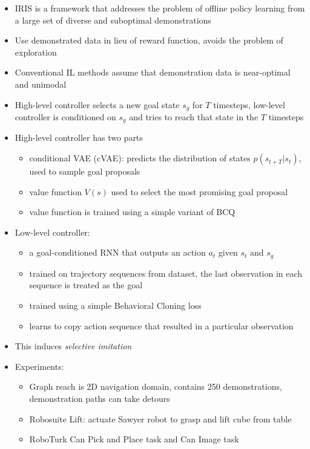 \begin{itemize}
  \item IRIS is a framework that addresses the problem of offline policy learning from a large set of diverse and suboptimal demonstrations
  \item Use demonstrated data in lieu of reward function, avoids the problem of exploration
  \item Conventional IL methods assume that demonstration data is near-optimal and unimodal
  \item High-level controller selects a new goal state $s_{g}$ for $T$ timesteps, low-level controller is conditioned on $s_{g}$ and tries to reach that state in the $T$ timesteps
  \item High-level controller has two parts
  \begin{itemize}
    \item conditional VAE (cVAE): predicts the distribution of states $p(s_{t+T}|s_{t})$, used to sample goal proposals
    \item value function $V(s)$ used to select the most promising goal proposal
    \item value function is trained using a simple variant of BCQ
  \end{itemize}
  \item Low-level controller:
  \begin{itemize}
    \item a goal-conditioned RNN that outputs an action $a_{t}$ given $s_{t}$ and $s_{g}$
    \item trained on trajectory sequences from dataset, the last observation in each sequence is treated as the goal
    \item trained using a simple Behavioral Cloning loss
    \item learns to copy action sequence that resulted in a particular observation
  \end{itemize}
  \item This induces \textit{selective imitation}
  \item Experiments:
  \begin{itemize}
    \item Graph reach is 2D navigation domain, contains 250 demonstrations, demonstration paths can take detours
    \item Robosuite Lift: actuate Sawyer robot to grasp and lift cube from table
    \item RoboTurk Can Pick and Place task and Can Image task
    \begin{figure}[h]

\end{figure}
\end{itemize}
\end{itemize}
